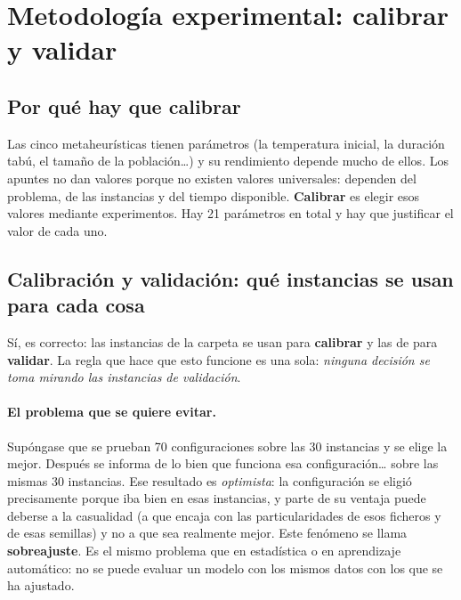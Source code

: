 \section{Metodología experimental: calibrar y validar}\label{sec:metodologia}

\subsection{Por qué hay que calibrar}

Las cinco metaheurísticas tienen parámetros (la temperatura inicial, la duración tabú, el
tamaño de la población\ldots) y su rendimiento depende mucho de ellos. Los apuntes no dan
valores porque no existen valores universales: dependen del problema, de las instancias y
del tiempo disponible. \textbf{Calibrar} es elegir esos valores mediante experimentos. Hay 21
parámetros en total y hay que justificar el valor de cada uno.

\subsection{Calibración y validación: qué instancias se usan para cada cosa}\label{sec:protocolo}

\begin{idea}
Sí, es correcto: las instancias de la carpeta  se usan para \textbf{calibrar} y
las de  para \textbf{validar}. La regla que hace que esto funcione es
una sola: \emph{ninguna decisión se toma mirando las instancias de validación}.
\end{idea}

\paragraph{El problema que se quiere evitar.} Supóngase que se prueban 70 configuraciones
sobre las 30 instancias y se elige la mejor. Después se informa de lo bien que funciona esa
configuración\ldots{} sobre las mismas 30 instancias. Ese resultado es \emph{optimista}: la
configuración se eligió precisamente porque iba bien en esas instancias, y parte de su
ventaja puede deberse a la casualidad (a que encaja con las particularidades de esos
ficheros y de esas semillas) y no a que sea realmente mejor. Este fenómeno se llama
\textbf{sobreajuste}. Es el mismo problema que en estadística o en aprendizaje automático:
no se puede evaluar un modelo con los mismos datos con los que se ha ajustado.

